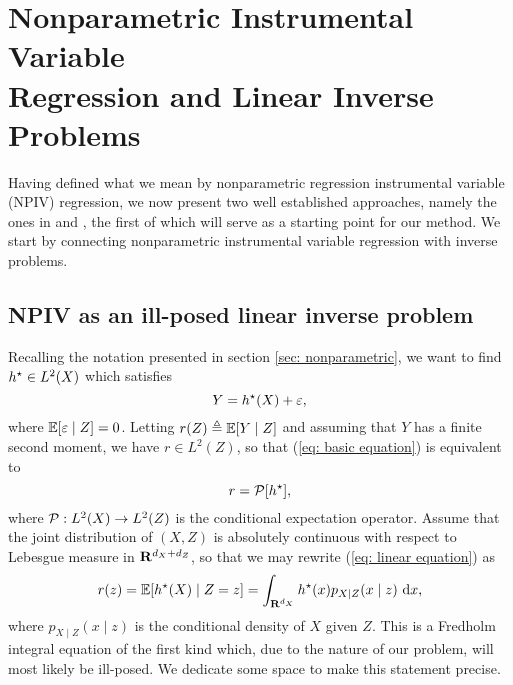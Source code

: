 \chapter{Nonparametric Instrumental Variable \\Regression and Linear Inverse Problems}

Having defined what we mean by nonparametric regression instrumental variable (NPIV) regression, we now present two well established approaches, namely the ones in \cite{darolles2011} and \cite{newey2003}, the first of which will serve as a starting point for our method.
We start by connecting nonparametric instrumental variable regression with inverse problems.

\section{NPIV as an ill-posed linear inverse problem}
\label{sec: npiv and ill posed lip}

Recalling the notation presented in section \ref{sec: nonparametric}, we want to find $ h^{ \star } \in L^{ 2 } ( X ) $ which satisfies
\begin{equation}
    \label{eq: basic equation}
    Y = h^{ \star } ( X ) + \varepsilon
,\end{equation}
where $ \mathbb{E} [ \varepsilon \mid Z ] = 0 $.
Letting $ r ( Z ) \triangleq \mathbb{E} [ Y \mid Z ] $ and assuming that $ Y $ has a finite second moment, we have $ r \in L^{ 2 } ( Z ) $, so that (\ref{eq: basic equation}) is equivalent to
\begin{equation}
    \label{eq: linear equation}
    r = \mathcal{P} [ h^{ \star } ]
,\end{equation}
where $ \mathcal{P} : L^{ 2 } ( X ) \to L^{ 2 } ( Z ) $ is the conditional expectation operator.
Assume that the joint distribution of $ ( X, Z ) $ is absolutely continuous with respect to Lebesgue measure in $ \mathbf{R}^{ d_{ X } + d_{ Z } } $, so that we may rewrite (\ref{eq: linear equation}) as
\begin{equation}
    \label{eq: expectation equation}
    r ( z ) = \mathbb{E} [ h^{ \star } ( X ) \mid Z = z ] = \int_{ \mathbf{R}^{ d_{ X } } } h^{ \star } ( x ) p_{ X \mid Z } ( x \mid z ) \ \mathrm{d} x
,\end{equation}
where $ p_{ X\mid Z } ( x \mid z ) $ is the conditional density of $ X $ given $ Z $.
This is a Fredholm integral equation of the first kind \cite{kress89} which, due to the nature of our problem, will most likely be ill-posed.
We dedicate some space to make this statement precise.

